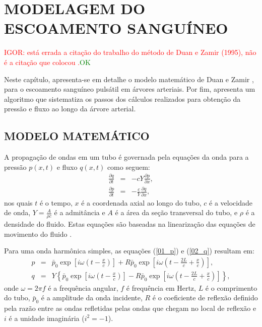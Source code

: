 \documentclass[a4paper,12pt]{monografia}
\theoremstyle{plain}
\theoremstyle{definition}
\theoremstyle{remark}
\begin{document}
\chapter{MODELAGEM DO ESCOAMENTO SANGUÍNEO}\label{sec:modelagem_escoamento}

\textcolor{red}{IGOR: está errada a citação do trabalho do método de Duan e Zamir (1995), não é a citação que colocou \cite{Duan}.}\textcolor{green}{OK}

Neste capítulo, apresenta-se em detalhe o modelo matemático de Duan e Zamir \cite{Duan1992}, para o escoamento sanguíneo pulsátil em árvores arteriais. Por fim, apresenta um algoritmo que sistematiza os passos dos cálculos realizados para obtenção da pressão e fluxo ao longo da árvore arterial.

\section{MODELO MATEMÁTICO}\label{sec:modelo_matematico}

A propagação de ondas em um tubo é governada pela equações da onda para a pressão $p(x,t)$ e fluxo $q(x,t)$ como seguem:
\begin{eqnarray}
	\frac{\partial q}{\partial t} &=& -cY \frac{\partial p}{\partial x},
	\label{01_p}\\
	\frac{\partial p}{\partial t} &=& -\frac{c}{Y} \frac{\partial q}{\partial x}, 
	\label{02_q}
\end{eqnarray}
nos quais $t$ é o tempo, $x$ é a coordenada axial ao longo do tubo, $c$ é a velocidade de onda, $Y = \frac{A}{\rho c}$ é a admitância e $A$ é a área da seção transversal do tubo, e $\rho$ é a densidade do fluido. Estas equações são baseadas na linearização das equações de movimento do fluido \cite{Fung,Lighthill}. 

Para uma onda harmônica simples, as equações (\ref{01_p}) e (\ref{02_q}) resultam em:
\begin{eqnarray}
	p &=& \bar{p}_0 \exp\left[i\omega\left(t - \frac{x}{c}\right)\right] + R  \bar{p}_0 \exp\left[i\omega\left(t - \frac{2L}{c} + \frac{x}{c}\right)\right],
	\label{03_p}\\
	q &=& Y\left\{\bar{p}_0 \exp\left[i\omega\left(t - \frac{x}{c}\right)\right] -  R  \bar{p}_0 \exp\left[i\omega\left(t - \frac{2L}{c} + \frac{x}{c}\right)\right]\right\},
	\label{04_1}
\end{eqnarray}
onde $\omega = 2 \pi f$ é a frequência angular, $f$ é frequência em Hertz, $L$ é o comprimento do tubo, $\bar{p}_0$ é a amplitude da onda incidente, $R$ é o coeficiente de reflexão definido pela razão entre as ondas refletidas pelas ondas que chegam no local de reflexão \cite{Fung,Karreman} e $i$ é a unidade imaginária ($i^2 = -1$).
\end{document}
